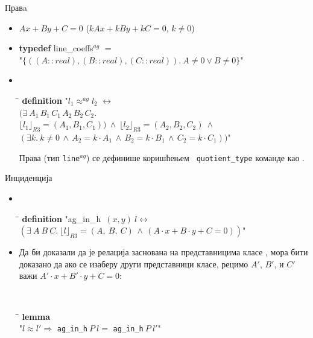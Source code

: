 \documentclass[slidestop, compress, mathserif, containsverbatim, xcolor=dvipsnames]{beamer}
\newcommand{\RepRt}[1]{\ensuremath{\lfloor#1\rfloor_{R3}}}
\begin{document}
\begin{frame}{Правa}
  \begin{itemize}
  \item $Ax + By + C = 0$ ($kAx + kBy + kC = 0$, $k \neq 0$) \vfill
  \item \begin{tabbing}
        {\bf typedef} line\_coeffs$^{ag}$ $=$ \\
        \hspace{5mm}"$\{((A::real), (B::real), (C::real)).\ A \neq 0 \vee B \neq 0\}$"
  \end{tabbing} \vfill
  \item {\tt
    \begin{tabbing}
      \hspace{5mm}\=\kill
      {\bf definition} "$l_1 \approx^{ag} l_2$ $\longleftrightarrow$ \\
      \>  $(\exists\ A_1\,B_1\,C_1\,A_2\,B_2\,C_2.$\\
      \>  $\RepRt{l_1} = (A_1, B_1, C_1)) \ \wedge\ \RepRt{l_2} = (A_2, B_2, C_2)\ \wedge$\\
      \>  $(\exists k.\ k \neq 0 \,\wedge\, A_2 = k\cdot A_1 \,\wedge\,  B_2 = k\cdot B_1\,\wedge\,C_2 = k\cdot C_1))$"
    \end{tabbing}
  }
    
  \begin{block}{}
    Права (тип {\tt line$^{ag}$}) се дефинише коришћењем {\tt
    quotient\_type} команде као .
  \end{block}
  \end{itemize}
\end{frame}

\begin{frame}{Инциденција}
  \begin{itemize}
    \item {\tt
      \begin{tabbing}
        \hspace{5mm}\=\hspace{5mm}\=\kill
        {\bf definition} "ag\_in\_h\ $(x, y)\ l \longleftrightarrow$\\
      \>$(\exists\ A\ B\ C.\ \RepRt{l} = (A,\ B,\ C) \,\wedge\,  (A\cdot x + B\cdot y + C = 0))$"
      \end{tabbing}
      } \vfill
    \item Да би доказали да је релација заснована на представницима
      класе , мора бити доказано да ако се
      изаберу други представници класе, рецимо $A'$, $B'$, и $C'$ важи
      $A'\cdot x + B'\cdot y + C = 0$:
      {\tt
        \begin{tabbing}
          \hspace{5mm}\=\hspace{5mm}\=\kill
          {\bf lemma} \\
           "$l \approx l' \Longrightarrow$ {\tt ag\_in\_h}$\ P\ l =$ {\tt ag\_in\_h}$\ P\ l'$"
        \end{tabbing}
      }
  \end{itemize}
\end{frame}
\end{document}
